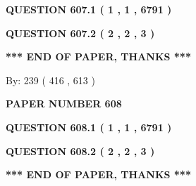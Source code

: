 \documentclass[12pt]{article}
\begin{document}
\vspace{0.2in}
  
{\textbf{\Large{QUESTION
607.1 
 ( 1 , 1 , 6791 )
}}}
  
  
  
\vspace{0.2in}
  
{\textbf{\Large{QUESTION
607.2 
 ( 2 , 2 , 3 )
}}}
  
  
   
   
 \vspace{0.2in}
 
   
   
   
   
\vspace{1.0in} 
{\textbf{\large{ *** END OF PAPER, THANKS *** }}} 
   
   
\hspace{1.0in} By: 
 239 ( 416 ,  613 )
   
   
   
   
\newpage 
\setcounter{page}{ 
   608001 } 
   
   
   
   
 {\textbf{ \Large{ PAPER NUMBER  608  }}}
   
   
\vspace{0.2in}
   
   
   
   
   
   
 \vspace{0.2in}
 
 
 
 
   
   
  
\vspace{0.2in}
  
{\textbf{\Large{QUESTION
608.1 
 ( 1 , 1 , 6791 )
}}}
  
  
  
\vspace{0.2in}
  
{\textbf{\Large{QUESTION
608.2 
 ( 2 , 2 , 3 )
}}}
  
  
   
   
 \vspace{0.2in}
 
   
   
   
   
\vspace{1.0in} 
{\textbf{\large{ *** END OF PAPER, THANKS *** }}} 
   
\end{document}
